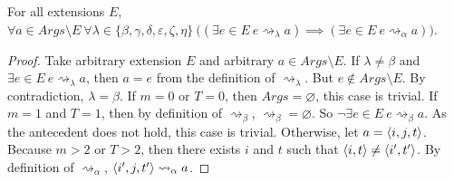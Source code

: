 \begin{lemma}
	\label{intervalstabilitydependence}
	For all extensions $E$, $\forall a\in Args\setminus E\ \forall\lambda\in\{\beta,\gamma,\delta,\varepsilon,\zeta,\eta\}\ \big((\exists e\in E\ e\rightsquigarrow_\lambda a)\implies(\exists e\in E\ e\rightsquigarrow_\alpha a)\big)$.
	
	\begin{proof}
		Take arbitrary extension $E$ and arbitrary $a\in Args\setminus E$. If $\lambda\neq\beta$ and $\exists e\in E\ e\rightsquigarrow_\lambda a$, then $a=e$ from the definition of $\rightsquigarrow_\lambda$. But $e\not\in Args\setminus E$. By contradiction, $\lambda=\beta$.
		\linespace
		If $m=0$ or $T=0$, then $Args=\varnothing$, this case is trivial.
		\linespace
		If $m=1$ and $T=1$, then by definition of $\rightsquigarrow_\beta$, $\rightsquigarrow_\beta=\varnothing$. So $\neg\exists e\in E\ e\rightsquigarrow_\beta a$. As the antecedent does not hold, this case is trivial.
		\linespace
		Otherwise, let $a=\langle{i},{j},{t}\rangle$. Because $m>2$ or $T>2$, then there exists $i$ and $t$ such that $\langle{i},{t}\rangle\neq\langle{i'},{t'}\rangle$. By definition of $\rightsquigarrow_\alpha$, $\langle{i'},{j},{t'}\rangle\rightsquigarrow_\alpha a$.
	\end{proof}
\end{lemma}

